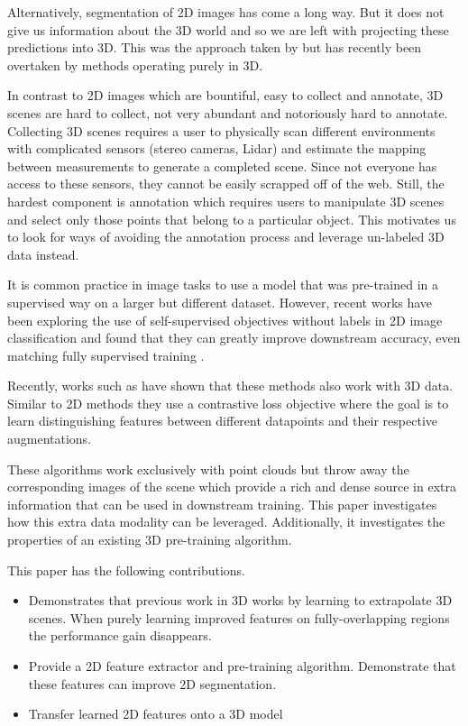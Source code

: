 \documentclass[10pt,twocolumn,letterpaper]{article}
\begin{document}
Alternatively, segmentation of 2D images has come a long way. But it does not give us information about the 3D world and so we are left with projecting these predictions into 3D. This was the approach taken by \cite{} but has recently been overtaken by methods operating purely in 3D.

In contrast to 2D images which are bountiful, easy to collect and annotate, 3D scenes are hard to collect, not very abundant and notoriously hard to annotate. Collecting 3D scenes requires a user to physically scan different environments with complicated sensors (\eg stereo cameras, Lidar) and estimate the mapping between measurements to generate a completed scene. Since not everyone has access to these sensors, they cannot be easily scrapped off of the web. Still, the hardest component is annotation which requires users to manipulate 3D scenes and select only those points that belong to a particular object. This motivates us to look for ways of avoiding the annotation process and leverage un-labeled 3D data instead.

It is common practice in image tasks to use a model that was pre-trained in a supervised way on a larger but different dataset. However, recent works have been exploring the use of self-supervised objectives without labels in 2D image classification and found that they can greatly improve downstream accuracy, even matching fully supervised training \cite{}.

Recently, works such as \cite{xie2020pointcontrast} have shown that these methods also work with 3D data. Similar to 2D methods they use a contrastive loss objective where the goal is to learn distinguishing features between different datapoints and their respective augmentations.

These algorithms work exclusively with point clouds but throw away the corresponding images of the scene which provide a rich and dense source in extra information that can be used in downstream training. This paper investigates how this extra data modality can be leveraged. Additionally, it investigates the properties of an existing 3D pre-training algorithm.

This paper has the following contributions.

\begin{itemize}
    \item Demonstrates that previous work in 3D \cite{xie2020pointcontrast} works by learning to extrapolate 3D scenes. When purely learning improved features on fully-overlapping regions the performance gain disappears.
    \item Provide a 2D feature extractor and pre-training algorithm. Demonstrate that these features can improve 2D segmentation.
    \item Transfer learned 2D features onto a 3D model
\end{itemize}
\end{document}
